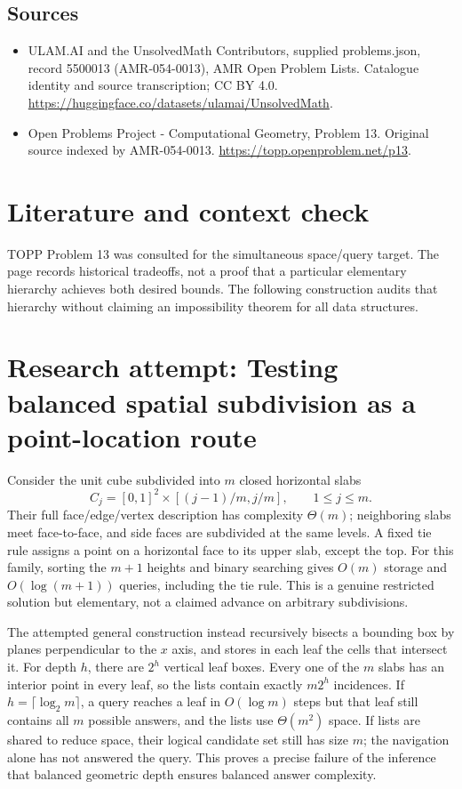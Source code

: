 \documentclass[11pt,a4paper]{article}
\begin{document}
\subsection{Sources}
\begin{itemize}
\item[S1] ULAM.AI and the UnsolvedMath Contributors, supplied problems.json, record 5500013 (AMR-054-0013), AMR Open Problem Lists. Catalogue identity and source transcription; CC BY 4.0.
\url{https://huggingface.co/datasets/ulamai/UnsolvedMath}.
\item[S2] Open Problems Project - Computational Geometry, Problem 13. Original source indexed by AMR-054-0013.
\url{https://topp.openproblem.net/p13}.
\end{itemize}

\section{Literature and context check}
TOPP Problem 13 was consulted for the simultaneous space/query target. The
page records historical tradeoffs, not a proof that a particular elementary
hierarchy achieves both desired bounds. The following construction audits that
hierarchy without claiming an impossibility theorem for all data structures.
\section{Research attempt: Testing balanced spatial subdivision as a point-location route}
Consider the unit cube subdivided into $m$ closed horizontal slabs
\[
 C_j=[0,1]^2\times[(j-1)/m,j/m],\qquad 1\le j\le m.
\]
Their full face/edge/vertex description has complexity $\Theta(m)$; neighboring
slabs meet face-to-face, and side faces are subdivided at the same levels. A fixed
tie rule assigns a point on a horizontal face to its upper slab, except the top.
For this family, sorting the $m+1$ heights and binary searching gives $O(m)$
storage and $O(\log(m+1))$ queries, including the tie rule. This is a genuine
restricted solution but elementary, not a claimed advance on arbitrary subdivisions.

The attempted general construction instead recursively bisects a bounding box
by planes perpendicular to the $x$ axis, and stores in each leaf the cells that
intersect it. For depth $h$, there are $2^h$ vertical leaf boxes. Every one of the
$m$ slabs has an interior point in every leaf, so the lists contain exactly
$m2^h$ incidences. If $h=\lceil\log_2m\rceil$, a query reaches a leaf in
$O(\log m)$ steps but that leaf still contains all $m$ possible answers, and
the lists use $\Theta(m^2)$ space. If lists are shared to reduce space, their
logical candidate set still has size $m$; the navigation alone has not answered
the query. This proves a precise failure of the inference that balanced geometric
depth ensures balanced answer complexity.
\end{document}
